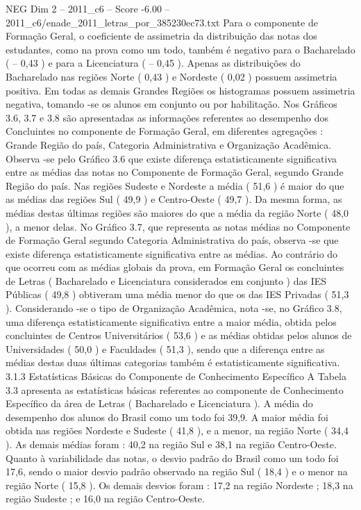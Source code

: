 \begin{textsample}{NEG Dim 2 – 2011\_c6 – Score -6.00 – 2011\_c6/enade\_2011\_letras\_por\_385230ec73.txt}
Para o componente de Formação Geral, o coeficiente de assimetria da distribuição das notas dos estudantes, como na prova como um todo, também é negativo para o Bacharelado ( – 0,43 ) e para a Licenciatura ( – 0,45 ).
Apenas as distribuições do Bacharelado nas regiões Norte ( 0,43 ) e Nordeste ( 0,02 ) possuem assimetria positiva.
Em todas as demais Grandes Regiões os histogramas possuem assimetria negativa, tomando -se os alunos em conjunto ou por habilitação.
Nos Gráficos 3.6, 3.7 e 3.8 são apresentadas as informações referentes ao desempenho dos Concluintes no componente de Formação Geral, em diferentes agregações : Grande Região do país, Categoria Administrativa e Organização Acadêmica.
Observa -se pelo Gráfico 3.6 que existe diferença estatisticamente significativa entre as médias das notas no Componente de Formação Geral, segundo Grande Região do país.
Nas regiões Sudeste e Nordeste a média ( 51,6 ) é maior do que as médias das regiões Sul ( 49,9 ) e Centro-Oeste ( 49,7 ).
Da mesma forma, as médias destas últimas regiões são maiores do que a média da região Norte ( 48,0 ), a menor delas.
No Gráfico 3.7, que representa as notas médias no Componente de Formação Geral segundo Categoria Administrativa do país, observa -se que existe diferença estatisticamente significativa entre as médias.
Ao contrário do que ocorreu com as médias globais da prova, em Formação Geral os concluintes de Letras ( Bacharelado e Licenciatura considerados em conjunto ) das IES Públicas ( 49,8 ) obtiveram uma média menor do que os das IES Privadas ( 51,3 ).
Considerando -se o tipo de Organização Acadêmica, nota -se, no Gráfico 3.8, uma diferença estatisticamente significativa entre a maior média, obtida pelos concluintes de Centros Universitários ( 53,6 ) e as médias obtidas pelos alunos de Universidades ( 50,0 ) e Faculdades ( 51,3 ), sendo que a diferença entre as médias destas duas últimas categorias também é estatisticamente significativa. 3.1.3 Estatísticas Básicas do Componente de Conhecimento Específico A Tabela 3.3 apresenta as estatísticas básicas referentes ao componente de Conhecimento Específico da área de Letras ( Bacharelado e Licenciatura ).
A média do desempenho dos alunos do Brasil como um todo foi 39,9.
A maior média foi obtida nas regiões Nordeste e Sudeste ( 41,8 ), e a menor, na região Norte ( 34,4 ).
As demais médias foram : 40,2 na região Sul e 38,1 na região Centro-Oeste.
Quanto à variabilidade das notas, o desvio padrão do Brasil como um todo foi 17,6, sendo o maior desvio padrão observado na região Sul ( 18,4 ) e o menor na região Norte ( 15,8 ).
Os demais desvios foram : 17,2 na região Nordeste ; 18,3 na região Sudeste ; e 16,0 na região Centro-Oeste.

\end{textsample}
